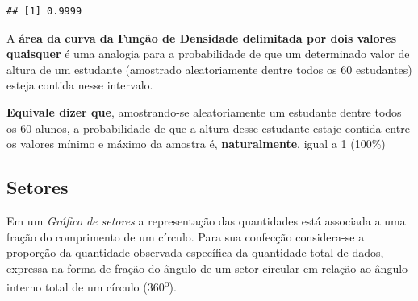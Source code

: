 \documentclass[
]{book}
\begin{document}
\begin{verbatim}
## [1] 0.9999
\end{verbatim}

\hfill\break

A \textbf{área da curva da Função de Densidade delimitada por dois valores quaisquer} é uma analogia para a probabilidade de que um determinado valor de altura de um estudante (amostrado aleatoriamente dentre todos os 60 estudantes) esteja contida nesse intervalo.

\hfill\break

\textbf{Equivale dizer que}, amostrando-se aleatoriamente um estudante dentre todos os 60 alunos, a probabilidade de que a altura desse estudante estaje contida entre os valores mínimo e máximo da amostra é, \textbf{naturalmente}, igual a 1 (100\%)

\hypertarget{setores}{%
\subsection{Setores}\label{setores}}

\hfill\break

Em um \emph{Gráfico de setores} a representação das quantidades está associada a uma fração do comprimento de um círculo. Para sua confecção considera-se a proporção da quantidade observada específica da quantidade total de dados, expressa na forma de fração do ângulo de um setor circular em relação ao ângulo interno total de um círculo (360\textsuperscript{o}).

\hfill\break
\hfill\break
\end{document}
